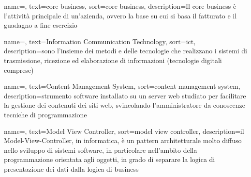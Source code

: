 
\renewcommand{\acronymname}{Acronimi e abbreviazioni}










\renewcommand{\glossaryname}{Glossario}

{
    name=,
    text=core business,
    sort=core business,
    description={Il core business è l'attività principale di un'azienda, ovvero la base su cui si basa il fatturato e il guadagno a fine esercizio}
}

{
		name=,
		text=Information Communication Technology,
		sort=ict,
		description={sono l'insieme dei metodi e delle tecnologie che realizzano i sistemi di trasmissione, ricezione ed elaborazione di informazioni (tecnologie digitali comprese)}
}

{
    name=,
    text=Content Management System,
    sort=content management system,
    description={strumento software installato su un server web studiato per facilitare la
gestione dei contenuti dei siti web, svincolando l’amministratore da conoscenze
tecniche di programmazione}
}

{
    name=,
    text=Model View Controller,
    sort=model view controller,
    description={il Model-View-Controller, in informatica, è un pattern architetturale molto diffuso nello sviluppo di sistemi software, in particolare nell’ambito della programmazione orientata agli oggetti, in grado di separare la logica di presentazione dei dati dalla logica di business}
}

